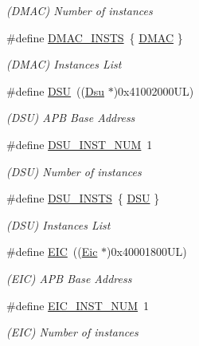 \begin{DoxyCompactItemize}
\begin{DoxyCompactList}\small\item\em (D\+M\+AC) Number of instances \end{DoxyCompactList}\item 
\#define \mbox{\hyperlink{group___s_a_m_d21_g15_l__base_gab1e67e0f9f094c76ae0740cd030b4326}{D\+M\+A\+C\+\_\+\+I\+N\+S\+TS}}~\{ \mbox{\hyperlink{group___s_a_m_d21_j18_a__base_ga9f8bc0e77445ff4bc6fc2db5c2828667}{D\+M\+AC}} \}
\begin{DoxyCompactList}\small\item\em (D\+M\+AC) Instances List \end{DoxyCompactList}\item 
\#define \mbox{\hyperlink{group___s_a_m_d21_g15_l__base_ga64552f972ce1670686fb30eb48ae1797}{D\+SU}}~((\mbox{\hyperlink{struct_dsu}{Dsu}}      $\ast$)0x41002000\+U\+L)
\begin{DoxyCompactList}\small\item\em (D\+SU) A\+PB Base Address \end{DoxyCompactList}\item 
\#define \mbox{\hyperlink{group___s_a_m_d21_g15_l__base_ga6496ebdaeee317b3afd0e1d867a12318}{D\+S\+U\+\_\+\+I\+N\+S\+T\+\_\+\+N\+UM}}~1
\begin{DoxyCompactList}\small\item\em (D\+SU) Number of instances \end{DoxyCompactList}\item 
\#define \mbox{\hyperlink{group___s_a_m_d21_g15_l__base_gaf0d80f8f8a1e7a6320587be7defa5fbe}{D\+S\+U\+\_\+\+I\+N\+S\+TS}}~\{ \mbox{\hyperlink{group___s_a_m_d21_j18_a__base_ga64552f972ce1670686fb30eb48ae1797}{D\+SU}} \}
\begin{DoxyCompactList}\small\item\em (D\+SU) Instances List \end{DoxyCompactList}\item 
\#define \mbox{\hyperlink{group___s_a_m_d21_g15_l__base_ga27183a94584b5fca7e1207ce7a79782a}{E\+IC}}~((\mbox{\hyperlink{struct_eic}{Eic}}      $\ast$)0x40001800\+U\+L)
\begin{DoxyCompactList}\small\item\em (E\+IC) A\+PB Base Address \end{DoxyCompactList}\item 
\#define \mbox{\hyperlink{group___s_a_m_d21_g15_l__base_ga60399071a15698b02e60c024082fcaee}{E\+I\+C\+\_\+\+I\+N\+S\+T\+\_\+\+N\+UM}}~1
\begin{DoxyCompactList}\small\item\em (E\+IC) Number of instances \end{DoxyCompactList}\item 

\end{DoxyCompactItemize}
